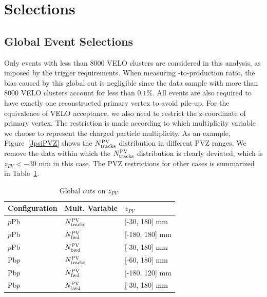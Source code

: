 \section{Selections}
\label{Selections}
\subsection{Global Event Selections}
Only events with less than 8000 VELO clusters are considered in this analysis, as imposed by the trigger requirements. When measuring \psitwos-to-\jpsi production ratio, the bias caused by this global cut is negligible since the data sample with more than 8000 VELO clusters account for less than $0.1\%$. All events are also required to have exactly one reconstructed primary vertex to avoid pile-up.
For the equivalence of VELO acceptance, we also need to restrict the z-coordinate of primary vertex. The restriction is made according to which multiplicity variable we choose to represent the charged particle multiplicity. As an example, Figure~\ref{JpsiPVZ} shows the $N_{\rm tracks}^{\rm PV}$ distribution in different PVZ ranges. We remove the data within which the $N_{\rm tracks}^{\rm PV}$ distribution is clearly deviated, which is $z_{PV}<-30$ mm in this case. The PVZ restrictions for other cases is summarized in Table~\ref{TablePVZ}.
\begin{table}[H]
\caption{Global cuts on $z_{PV}$.}
\begin{center}
\begin{tabular}{lll}
\hline
\textbf{Configuration} & \textbf{Mult. Variable} & \textbf{$z_{PV}$}\\
\hline
	$p$Pb & $N_{\rm tracks}^{\rm PV}$ & [-30, 180] mm\\
	$p$Pb & $N_{\rm fwd}^{\rm PV}$ & [-180, 180] mm\\
	$p$Pb & $N_{\rm bwd}^{\rm PV}$ & [-30, 180] mm\\
	Pb$p$ & $N_{\rm tracks}^{\rm PV}$ & [-60, 180] mm\\
        Pb$p$ & $N_{\rm fwd}^{\rm PV}$ & [-180, 120] mm\\
        Pb$p$ & $N_{\rm bwd}^{\rm PV}$ & [-30, 180] mm\\
\hline
\end{tabular}
\end{center}
\label{TablePVZ}
\end{table}

